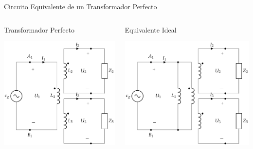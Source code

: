 \documentclass[aspectratio=169, usenames,svgnames,dvipsnames]{beamer}
\begin{document}
\begin{frame}[label={sec:org17c9141}]{Circuito Equivalente de un Transformador Perfecto}
\vspace{0.3cm}
\begin{columns}
\begin{column}[t]{0.5\columnwidth}
Transformador Perfecto
\begin{center}
\includegraphics[width=\textwidth]{../figs/TrafoPerfectoVariosDevanados_Impedancia.pdf}
\end{center}
\end{column}

\begin{column}[t]{0.5\columnwidth}
Equivalente Ideal
\begin{center}
\includegraphics[width=\textwidth]{../figs/TrafoPerfectoIdealVariosDevanados_Impedancia.pdf}
\end{center}
\end{column}
\end{columns}
\end{frame}
\end{document}
